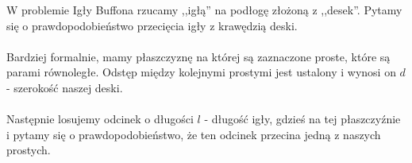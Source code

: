 W problemie Igły Buffona rzucamy ,,igłą''  na podłogę złożoną z ,,desek''. Pytamy się o prawdopodobieństwo przecięcia igły z krawędzią deski.\\ \\
Bardziej formalnie, mamy płaszczyznę na której są zaznaczone proste, które są parami równoległe. Odstęp między kolejnymi prostymi jest ustalony i wynosi on \(d\) - szerokość naszej deski.\\ \\
Następnie losujemy odcinek o długości \(l\) - długość igły, gdzieś na tej płaszczyźnie i pytamy się o prawdopodobieństwo, że ten odcinek przecina jedną z naszych prostych.
